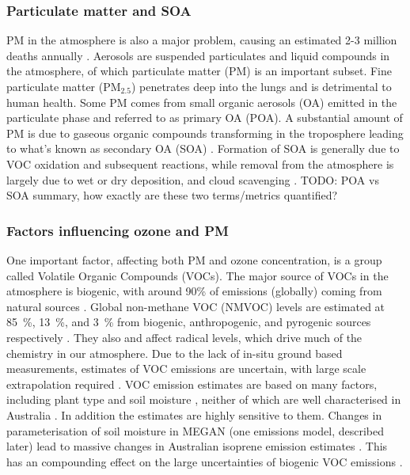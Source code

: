     \subsubsection{Particulate matter and SOA}
      PM in the atmosphere is also a major problem, causing an estimated 2-3 million deaths annually \citep{Hoek2013, Krewski2009, Silva2013, Lelieveld2015}. 
      Aerosols are suspended particulates and liquid compounds in the atmosphere, of which particulate matter (PM) is an important subset.
      Fine particulate matter (PM$_{2.5}$) penetrates deep into the lungs and is detrimental to human health.
      Some PM comes from small organic aerosols (OA) emitted in the particulate phase and referred to as primary OA (POA).
      A substantial amount of PM is due to gaseous organic compounds transforming in the troposphere leading to what's known as secondary OA (SOA) \citep{Kroll2008}.
      Formation of SOA is generally due to VOC oxidation and subsequent reactions, while removal from the atmosphere is largely due to wet or dry deposition, and cloud scavenging \citep{Kanakidou2005}.
      TODO: POA vs SOA summary, how exactly are these two terms/metrics quantified?
    
    
    \subsubsection{Factors influencing ozone and PM}
      
      One important factor, affecting both PM and ozone concentration, is a group called Volatile Organic Compounds (VOCs).
      The major source of VOCs in the atmosphere is biogenic, with around 90\% of emissions (globally) coming from natural sources \citep{Guenther1995,Guenther2006, Millet2006}.
      Global non-methane VOC (NMVOC) levels are estimated at 85~\%, 13~\%, and 3~\% from biogenic, anthropogenic, and pyrogenic sources respectively \citep{Kefauver2014}.  
      They also and affect radical levels, which drive much of the chemistry in our atmosphere.
      Due to the lack of in-situ ground based measurements, estimates of VOC emissions are uncertain, with large scale extrapolation required \citet{Millet2006}.
      VOC emission estimates are based on many factors, including plant type and soil moisture \citep{Guenther1995}, neither of which are well characterised in Australia \citep{Sindelarova2014, Bauwens2016}.
      In addition the estimates are highly sensitive to them.
      Changes in parameterisation of soil moisture in MEGAN (one emissions model, described later) lead to massive changes in Australian isoprene emission estimates \citep{Sindelarova2014}.
      This has an compounding effect on the large uncertainties of biogenic VOC emissions \citep{Guenther2000, Millet2006}.
      
